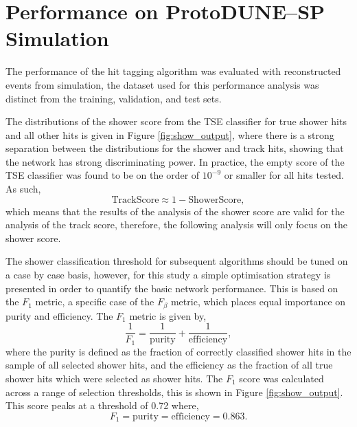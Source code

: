 \section{Performance on ProtoDUNE--SP Simulation} \label{cnn-perf-sim}

The performance of the hit tagging algorithm was evaluated with reconstructed
events from \protodune{} simulation, the dataset used for this performance
analysis was distinct from the training, validation, and test sets. 

The distributions of the shower score from the TSE classifier for true shower 
hits and all other hits is given in Figure \ref{fig:show_output}, where there is a 
strong separation between the distributions for the shower and track hits, 
showing that the network has strong discriminating power. In practice, the 
empty score of the TSE classifier was found to be on the order of $10^{-9}$ or 
smaller for all hits tested. As such,
\begin{equation*}
	\mbox{TrackScore} \approx 1 - \mbox{ShowerScore},
\end{equation*}
which means that the results of the analysis of the shower score are valid for
the analysis of the track score, therefore, the following analysis will only 
focus on the shower score.

The shower classification threshold for subsequent algorithms should be tuned on
a case by case basis, however, for this study a simple optimisation strategy 
is presented in order to quantify the basic network performance. This is based
on the $F_1$ metric, a specific case of the $F_\beta$ 
metric\cite{VanRijsbergenC.J.1975Ir}, which places equal importance on 
purity and efficiency. The $F_1$ metric is given by, 
\begin{equation*}
	\frac{1}{F_1} = \frac{1}{\mbox{purity}} + \frac{1}{\mbox{efficiency}},
\end{equation*}
where the purity is defined as the fraction of correctly classified shower 
hits in the sample of all selected shower hits, and the efficiency as the 
fraction of all true shower hits which were selected as shower hits. The $F_1$ 
score was calculated across a range of selection thresholds, this is shown in 
Figure \ref{fig:show_output}. This score peaks at a threshold of 0.72 where, 
\begin{equation*} 
	F_1 = \mbox{purity} = \mbox{efficiency} = 0.863.  
\end{equation*}

